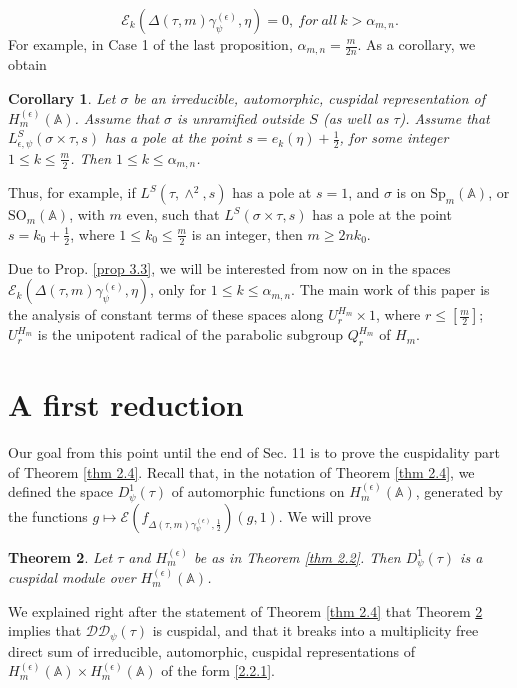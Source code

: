 \documentclass[12pts]{amsart}
\newcommand{\BA}{{\mathbb {A}}}
\newcommand{\SO}{{\mathrm{SO}}}
\newcommand{\Sp}{{\mathrm{Sp}}}
\newtheorem{thm}{Theorem}[section]
\newtheorem{cor}[thm]{Corollary}
\begin{document}
\begin{equation}\label{3.11}
\mathcal{E}_k(\Delta(\tau,m)\gamma_\psi^{(\epsilon)},\eta)=0,\ for\ all \ k>\alpha_{m,n}.
\end{equation}
For example, in Case 1 of the last proposition, $\alpha_{m,n}=\frac{m}{2n}$.
As a corollary, we obtain
\begin{cor}\label{cor 3.4}
Let $\sigma$ be an irreducible, automorphic, cuspidal representation of $H_m^{(\epsilon)}(\BA)$. Assume that $\sigma$ is unramified outside $S$ (as well as $\tau$).
Assume that $L^S_{\epsilon,\psi}(\sigma\times \tau, s)$ has a pole at the point $s=e_k(\eta)+\frac{1}{2}$, for some integer $1\leq k\leq \frac{m}{2}$. Then $1\leq k\leq \alpha_{m,n}$.
\end{cor}
Thus, for example, if $L^S(\tau,\wedge^2,s)$ has a pole at $s=1$, and $\sigma$ is on $\Sp_m(\BA)$, or $\SO_m(\BA)$, with $m$ even, such that $L^S(\sigma\times \tau, s)$ has a pole at the point $s=k_0+\frac{1}{2}$, where $1\leq k_0\leq \frac{m}{2}$ is an integer, then $m\geq 2nk_0$.

Due to Prop. \ref{prop 3.3}, we will be interested from now on in the spaces\\
 $\mathcal{E}_k(\Delta(\tau,m)\gamma_\psi^{(\epsilon)},\eta)$, only for $1\leq k\leq\alpha_{m,n}$.
The main work of this paper is the analysis of constant terms of these spaces along $U^{H_m}_r\times 1$, where $r\leq [\frac{m}{2}]$;  $U^{H_m}_r$ is the unipotent radical of the parabolic subgroup $Q_r^{H_m}$ of $H_m$.

\section{ A first reduction}

Our goal from this point until the end of Sec. 11 is to prove the cuspidality part of Theorem \ref{thm 2.4}. Recall that, in the notation of Theorem \ref{thm 2.4}, we defined the space $D^1_\psi(\tau)$ of automorphic functions on $H^{(\epsilon)}_m(\BA)$, generated by the functions $g\mapsto \mathcal{E}(f_{\Delta(\tau,m)\gamma^{(\epsilon)}_\psi,\frac{1}{2}})(g,1)$. We will prove
\begin{thm}\label{thm 4.1}
Let $\tau$ and $H^{(\epsilon)}_m$ be as in Theorem \ref{thm 2.2}. Then $D^1_\psi(\tau)$ is a cuspidal module over $H^{(\epsilon)}_m(\BA)$.
\end{thm}
We explained right after the statement of Theorem \ref{thm 2.4} that Theorem \ref{thm 4.1} implies that $\mathcal{D}\mathcal{D}_\psi(\tau)$ is cuspidal, and that it breaks into a multiplicity free direct sum of irreducible, automorphic, cuspidal representations of 
$H^{(\epsilon)}_m(\BA)\times H^{(\epsilon)}_m(\BA)$ of the form \eqref{2.2.1}. 
\end{document}
